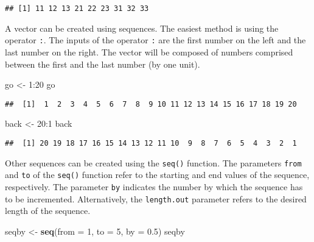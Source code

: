\documentclass[]{book}
\newenvironment{Shaded}{\begin{snugshade}}{\end{snugshade}}
\newcommand{\KeywordTok}[1]{\textcolor[rgb]{0.13,0.29,0.53}{\textbf{{#1}}}}
\newcommand{\DataTypeTok}[1]{\textcolor[rgb]{0.13,0.29,0.53}{{#1}}}
\newcommand{\DecValTok}[1]{\textcolor[rgb]{0.00,0.00,0.81}{{#1}}}
\newcommand{\FloatTok}[1]{\textcolor[rgb]{0.00,0.00,0.81}{{#1}}}
\newcommand{\StringTok}[1]{\textcolor[rgb]{0.31,0.60,0.02}{{#1}}}
\newcommand{\NormalTok}[1]{{#1}}
\begin{document}
\begin{verbatim}
## [1] 11 12 13 21 22 23 31 32 33
\end{verbatim}

A vector can be created using sequences. The easiest method is using the
operator \texttt{:}. The inputs of the operator \texttt{:} are the first
number on the left and the last number on the right. The vector will be
composed of numbers comprised between the first and the last number (by
one unit).

\begin{Shaded}
\begin{Highlighting}[]
\NormalTok{go <-}\StringTok{ }\DecValTok{1}\NormalTok{:}\DecValTok{20}
\NormalTok{go}
\end{Highlighting}
\end{Shaded}

\begin{verbatim}
##  [1]  1  2  3  4  5  6  7  8  9 10 11 12 13 14 15 16 17 18 19 20
\end{verbatim}

\begin{Shaded}
\begin{Highlighting}[]
\NormalTok{back <-}\StringTok{ }\DecValTok{20}\NormalTok{:}\DecValTok{1}
\NormalTok{back}
\end{Highlighting}
\end{Shaded}

\begin{verbatim}
##  [1] 20 19 18 17 16 15 14 13 12 11 10  9  8  7  6  5  4  3  2  1
\end{verbatim}

Other sequences can be created using the \texttt{seq()} function. The
parameters \texttt{from} and \texttt{to} of the \texttt{seq()} function
refer to the starting and end values of the sequence, respectively. The
parameter \texttt{by} indicates the number by which the sequence has to
be incremented. Alternatively, the \texttt{length.out} parameter refers
to the desired length of the sequence.

\begin{Shaded}
\begin{Highlighting}[]
\NormalTok{seqby <-}\StringTok{ }\KeywordTok{seq}\NormalTok{(}\DataTypeTok{from =} \DecValTok{1}\NormalTok{, }\DataTypeTok{to =} \DecValTok{5}\NormalTok{, }\DataTypeTok{by =} \FloatTok{0.5}\NormalTok{)}
\NormalTok{seqby}
\end{Highlighting}
\end{Shaded}
\end{document}

